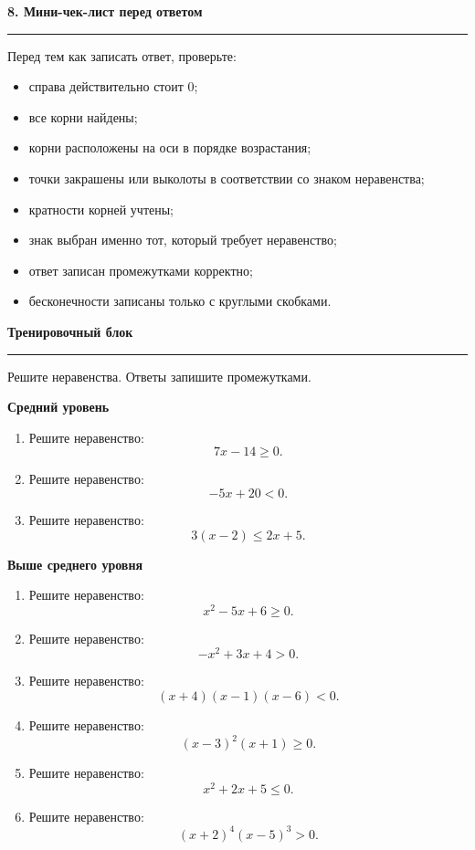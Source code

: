 \documentclass[a4paper,12pt]{article}
\newcommand{\sectiontitle}[1]{%
  \vspace{0.6em}
  {\Large\bfseries\textcolor{darkaccent}{#1}}\par
  \vspace{0.25em}
  {\color{accent}\rule{\linewidth}{0.5pt}}
  \vspace{0.4em}
}
\newcommand{\subsectiontitle}[1]{%
  \vspace{0.5em}
  {\large\bfseries\textcolor{darkaccent}{#1}}\par
  \vspace{0.15em}
}
\begin{document}
\sectiontitle{8. Мини-чек-лист перед ответом}

Перед тем как записать ответ, проверьте:

\begin{itemize}
  \item справа действительно стоит $0$;
  \item все корни найдены;
  \item корни расположены на оси в порядке возрастания;
  \item точки закрашены или выколоты в соответствии со знаком неравенства;
  \item кратности корней учтены;
  \item знак выбран именно тот, который требует неравенство;
  \item ответ записан промежутками корректно;
  \item бесконечности записаны только с круглыми скобками.
\end{itemize}

\newpage

\sectiontitle{Тренировочный блок}

Решите неравенства. Ответы запишите промежутками.

\subsectiontitle{Средний уровень}

\begin{enumerate}
  \item Решите неравенство:
  \[
  7x-14\ge 0.
  \]

  \item Решите неравенство:
  \[
  -5x+20<0.
  \]

  \item Решите неравенство:
  \[
  3(x-2)\le 2x+5.
  \]
\end{enumerate}

\subsectiontitle{Выше среднего уровня}

\begin{enumerate}[resume]
  \item Решите неравенство:
  \[
  x^2-5x+6\ge 0.
  \]

  \item Решите неравенство:
  \[
  -x^2+3x+4>0.
  \]

  \item Решите неравенство:
  \[
  (x+4)(x-1)(x-6)<0.
  \]

  \item Решите неравенство:
  \[
  (x-3)^2(x+1)\ge 0.
  \]

  \item Решите неравенство:
  \[
  x^2+2x+5\le 0.
  \]

  \item Решите неравенство:
  \[
  (x+2)^4(x-5)^3>0.
  \]
\end{enumerate}
\end{document}

